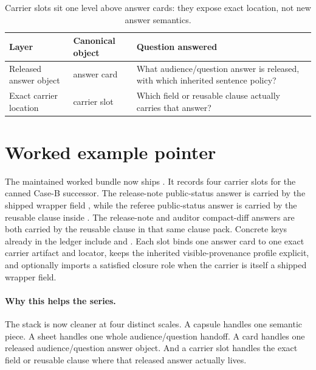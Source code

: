 \documentclass[11pt]{article}
\begin{document}
\begin{table}[t]
\centering
\small
\begin{tabularx}{\linewidth}{@{}l l X@{}}
\toprule
Layer & Canonical object & Question answered \\
\midrule
Released answer object & answer card & What audience/question answer is released, with which inherited sentence policy? \\
Exact carrier location & carrier slot & Which field or reusable clause actually carries that answer? \\
\bottomrule
\end{tabularx}
\caption{Carrier slots sit one level above answer cards: they expose exact location, not new answer semantics.}
\label{tab:answercarrierslots}
\end{table}

\section{Worked example pointer}
The maintained worked bundle now ships .\cite{series:workedexample}
It records four carrier slots for the canned Case-B successor.
The release-note public-status answer is carried by the shipped wrapper field , while the referee public-status answer is carried by the reusable clause  inside .
The release-note and auditor compact-diff answers are both carried by the reusable clause  in that same clause pack.
Concrete keys already in the ledger include  and .
Each slot binds one answer card to one exact carrier artifact and locator, keeps the inherited visible-provenance profile explicit, and optionally imports a satisfied closure role when the carrier is itself a shipped wrapper field.

\paragraph{Why this helps the series.}
The stack is now cleaner at four distinct scales.
A capsule handles one semantic piece.
A sheet handles one whole audience/question handoff.
A card handles one released audience/question answer object.
And a carrier slot handles the exact field or reusable clause where that released answer actually lives.
\end{document}
